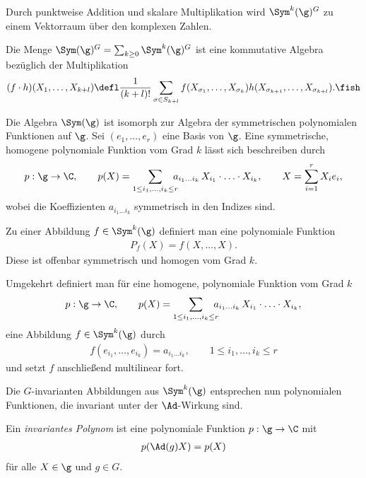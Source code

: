 \documentclass[%
	paper=a5,%
	fleqn,%
	DIV=18,%
	BCOR=0mm,
	fontsize=11pt,
	titlepage=false,%
	bibliography=totoc,
	DIV=18,%
	twoside=true,
	pdftitle=Riemannsche Geometrie,
	pdfauthor=Uwe Semmelmann,
	numbers=noendperiod]%
	{scrbook}
\begin{document}
Durch punktweise Addition und skalare Multiplikation wird $\Sym^k(\g)^G$ zu
einem Vektorraum über den komplexen Zahlen.

\begin{lem}
Die Menge $\Sym(\g)^G = \sum_{k\ge0} \Sym^k(\g)^G$ ist eine kommutative
Algebra bezüglich der Multiplikation
\begin{align*}
(f\cdot h)(X_1,\ldots,X_{k+l}) \defl
\frac{1}{(k+l)!}\sum_{\sigma\in S_{k+l}} f(X_{\sigma_1},\ldots,X_{\sigma_k})
h(X_{\sigma_{k+1}},\ldots,X_{\sigma_{k+l}}).\fish
\end{align*}
\end{lem}

\begin{rem}
Die Algebra $\Sym(\g)$ ist isomorph zur Algebra der symmetrischen polynomialen
Funktionen auf $\g$. Sei $(e_1,\ldots,e_r)$ eine Basis von $\g$. Eine
symmetrische, homogene polynomiale Funktion vom Grad $k$ lässt sich beschreiben
durch
\begin{align*}
p: \g\to \C,\qquad p(X)
 = \sum_{1\le i_1,\ldots,i_k \le r}
\!\!\!\!
a_{i_1\ldots i_k}\, X_{i_1}\cdot \ldots \cdot X_{i_k},
\qquad
X=\sum_{i=1}^r X_i e_i,
\end{align*}
wobei die Koeffizienten $a_{i_1\ldots i_k}$ symmetrisch in den Indizes sind.

Zu einer Abbildung $f\in \Sym^k(\g)$ definiert man eine polynomiale Funktion
\begin{align*}
P_f(X)  = f(X,\ldots,X).
\end{align*}
Diese ist offenbar symmetrisch und homogen vom Grad $k$.

Umgekehrt definiert man für eine homogene, polynomiale Funktion vom Grad $k$
\begin{align*}
p: \g\to \C,\qquad p(X) = \sum_{1\le i_1,\ldots,i_k \le r}
\!\!\!\!
a_{i_1\ldots i_k}\, X_{i_1}\cdot \ldots \cdot X_{i_k},
\end{align*}
eine Abbildung $f\in \Sym^k(\g)$ durch
\begin{align*}
f(e_{i_1},\ldots,e_{i_k}) = a_{i_1\ldots i_k},\qquad 1\le i_1,\ldots,i_k \le r
\end{align*}
und setzt $f$ anschließend multilinear fort.\map
\end{rem}

Die $G$-invarianten Abbildungen aus $\Sym^k(\g)$ entsprechen nun polynomialen
Funktionen, die invariant unter der $\Ad$-Wirkung sind.

\begin{defn}
Ein \emph{invariantes Polynom} ist eine polynomiale Funktion $p:\g\to \C$ mit
\begin{align*}
p(\Ad(g)X) = p(X)
\end{align*}
für alle $X\in\g$ und $g\in G$.\fish
\end{defn}
\end{document}
